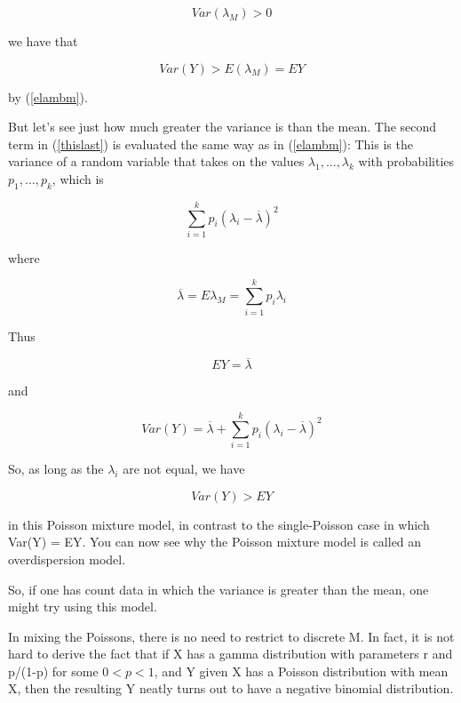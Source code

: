 \documentclass[11pt]{article}
\begin{document}
\begin{equation}
Var(\lambda_M) > 0
\end{equation}

we have that

\begin{equation}
Var(Y) > E(\lambda_M) = EY
\end{equation}

by (\ref{elambm}).

But let's see just how much greater the variance is than the mean.  The
second term in (\ref{thislast}) is evaluated the same way as in
(\ref{elambm}):  This is the variance of a random variable that takes on
the values $\lambda_1,...,\lambda_k$ with probabilities $p_1,...,p_k$,
which is

\begin{equation}
\sum_{i=1}^k p_i (\lambda_i - \overline{\lambda})^2
\end{equation}

where 

\begin{equation}
\overline{\lambda} =  E\lambda_M = \sum_{i=1}^k p_i \lambda_i
\end{equation}

Thus

\begin{equation}
EY = \overline{\lambda}
\end{equation}

and

\begin{equation}
Var(Y) = \overline{\lambda} + 
\sum_{i=1}^k p_i (\lambda_i - \overline{\lambda})^2
\end{equation}

So, as long as the $\lambda_i$ are not equal, we have

\begin{equation}
Var(Y) > EY
\end{equation}

in this Poisson mixture model, in contrast to the single-Poisson case
in which Var(Y) = EY.  You can now see why the Poisson mixture model is
called an overdispersion model.

So, if one has count data in which the variance is greater than the
mean, one might try using this model.

In mixing the Poissons, there is no need to restrict to discrete M.  In
fact, it is not hard to derive the fact that if X has a gamma
distribution with parameters r and p/(1-p) for some $0 < p < 1$, and Y
given X has a Poisson distribution with mean X, then the resulting Y
neatly turns out to have a negative binomial distribution.
\end{document}
